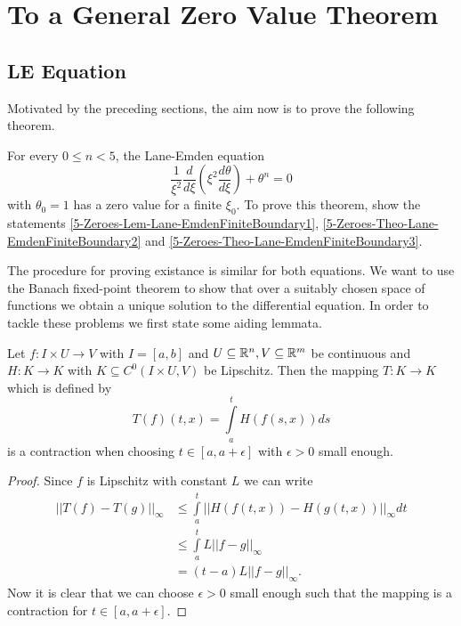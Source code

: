 \section{To a General Zero Value Theorem}
\subsection{LE Equation}
Motivated by the preceding sections, the aim now is to prove the following theorem.
\begin{theorem}
	\label{5-Zeroes-The-Lane-EmdenFiniteBoundary}
	For every $0\leq n<5$, the Lane-Emden equation
	\begin{equation}
		\frac{1}{\xi^2}\frac{d}{d\xi}\left(\xi^2\frac{d\theta}{d\xi}\right)+\theta^n=0
		\label{5-Zeroes-Equ-LEeq}
	\end{equation}
	with $\theta_0=1$ has a zero value for a finite $\xi_0$. To prove this theorem, show the statements \ref{5-Zeroes-Lem-Lane-EmdenFiniteBoundary1}, 
	\ref{5-Zeroes-Theo-Lane-EmdenFiniteBoundary2} and \ref{5-Zeroes-Theo-Lane-EmdenFiniteBoundary3}.
\end{theorem}
The procedure for proving existance is similar for both equations.
We want to use the Banach fixed-point theorem to show that over a suitably chosen space of functions we obtain a unique solution to the differential equation.
In order to tackle these problems we first state some aiding lemmata.
\begin{lemma}
	\label{5-Zeroes-Lem-Integral-Contraction}
	Let $f:I\times U\rightarrow V$ with $I=[a,b]$ and $U\subseteq\mathbb{R}^n,V\subseteq\mathbb{R}^m$ be continuous and $H:K\rightarrow K$ with $K\subseteq C^0(I\times U,V)$ be Lipschitz.
	Then the mapping $T:K\rightarrow K$ which is defined by
	\begin{equation}
		T(f)(t,x)=\int\limits_a^tH(f(s,x))ds
	\end{equation}
	is a contraction when choosing $t\in[a,a+\epsilon]$ with $\epsilon>0$ small enough.
\end{lemma}
\begin{proof}
	Since $f$ is Lipschitz with constant $L$ we can write
	\begin{align}
		||T(f)-T(g)||_\infty 	&\leq \int\limits_a^t||H(f(t,x))-H(g(t,x))||_\infty dt\\
								&\leq \int\limits_a^tL||f-g||_\infty\\
								&=(t-a)L||f-g||_\infty.
	\end{align}
	Now it is clear that we can choose $\epsilon>0$ small enough such that the mapping is a contraction for $t\in[a,a+\epsilon]$.
\end{proof}
